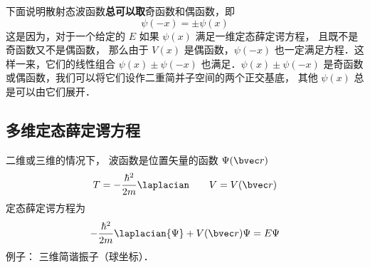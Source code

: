 下面说明散射态波函数\textbf{总可以取}奇函数和偶函数，即
\begin{equation}\label{SchEq_eq3}
\psi(-x) = \pm \psi(x)
\end{equation}
这是因为，对于一个给定的 $E$ 如果 $\psi(x)$ 满足一维定态薛定谔方程， 且既不是奇函数又不是偶函数， 那么由于 $V(x)$ 是偶函数，$\psi(-x)$ 也一定满足方程．这样一来，它们的线性组合 $\psi(x)\pm\psi(-x)$ 也满足．$\psi(x)\pm \psi(-x)$ 是奇函数或偶函数，我们可以将它们设作二重简并子空间的两个正交基底， 其他 $\psi(x)$ 总是可以由它们展开．

\subsection{多维定态薛定谔方程}
二维或三维的情况下， 波函数是位置矢量的函数 $\Psi(\bvec r)$
\begin{equation}
T = -\frac{\hbar^2}{2m} \laplacian \qquad V = V(\bvec r)
\end{equation}
定态薛定谔方程为
\begin{equation}\label{SchEq_eq4}
-\frac{\hbar^2}{2m} \laplacian {\Psi} + V(\bvec r)\Psi = E \Psi
\end{equation}
例子： 三维简谐振子（球坐标）．

